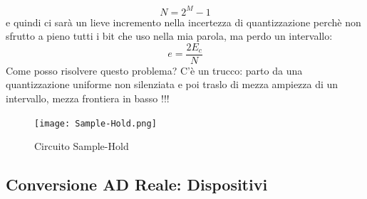\documentclass{article}
\begin{document}
\begin{equation}
    N=2^M-1
\end{equation}
e quindi ci sarà un lieve incremento nella incertezza di quantizzazione perchè non sfrutto a pieno tutti i bit che uso nella mia parola, ma perdo un intervallo:
\begin{equation}
    e=\frac{2E_{c}}{N}
\end{equation}
Come posso risolvere questo problema? C'è un trucco: parto da una quantizzazione uniforme non silenziata e poi traslo di mezza ampiezza di un intervallo, mezza frontiera in basso !!!
\begin{figure}
    \centering
    \texttt{[image: Sample-Hold.png]}
    \caption{Circuito Sample-Hold}
    \label{fig:my_label}
\end{figure}
\subsection{Conversione AD Reale: Dispositivi}
\end{document}

